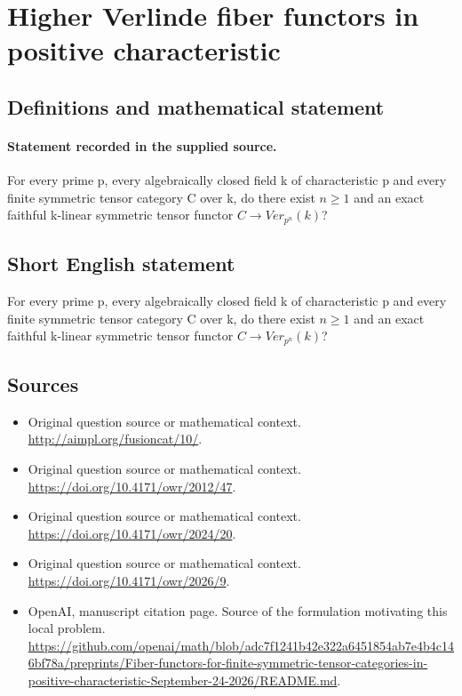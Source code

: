 \documentclass[11pt]{article}
\begin{document}
\section*{Higher Verlinde fiber functors in positive characteristic}\label{30006995}
\subsection{Definitions and mathematical statement}
\paragraph{Statement recorded in the supplied source.}
For every prime p, every algebraically closed field k of characteristic p and every finite symmetric tensor category C over k, do there exist $n\geq 1$ and an exact faithful k-linear symmetric tensor functor $C\to Ver_{p^n}(k)$?
\subsection{Short English statement}
For every prime p, every algebraically closed field k of characteristic p and every finite symmetric tensor category C over k, do there exist $n\geq 1$ and an exact faithful k-linear symmetric tensor functor $C\to Ver_{p^n}(k)$?
\subsection{Sources}
\begin{itemize}
\item[S1] Original question source or mathematical context.
\url{http://aimpl.org/fusioncat/10/}.
\item[S2] Original question source or mathematical context.
\url{https://doi.org/10.4171/owr/2012/47}.
\item[S3] Original question source or mathematical context.
\url{https://doi.org/10.4171/owr/2024/20}.
\item[S4] Original question source or mathematical context.
\url{https://doi.org/10.4171/owr/2026/9}.
\item[S5] OpenAI, manuscript citation page. Source of the formulation motivating this local problem.
\url{https://github.com/openai/math/blob/adc7f1241b42e322a6451854ab7e4b4c146bf78a/preprints/Fiber-functors-for-finite-symmetric-tensor-categories-in-positive-characteristic-September-24-2026/README.md}.
\end{itemize}
\end{document}
